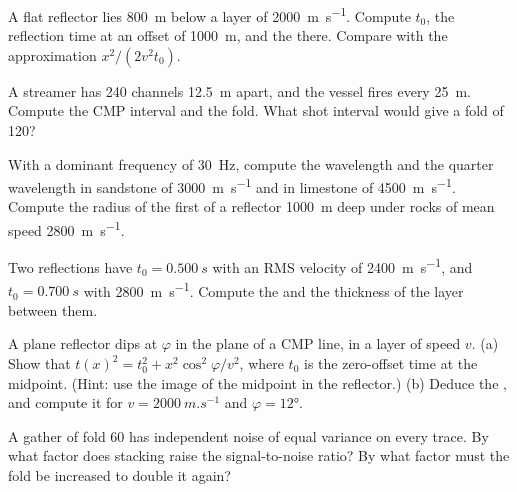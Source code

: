 \begin{exercise}[$\star$]\label{exo:b3:exploration-seismology:2}
A flat reflector lies \qty{800}{m} below a layer of \qty{2000}{m.s^{-1}}.
Compute $t_0$, the reflection time at an offset of \qty{1000}{m}, and the  there. Compare with the approximation $x^2/(2v^2t_0)$.
\end{exercise}

\begin{exercise}[$\star$]\label{exo:b3:exploration-seismology:3}
A streamer has 240 channels \qty{12.5}{m} apart, and the vessel fires every
\qty{25}{m}. Compute the CMP interval and the fold. What shot interval would
give a fold of 120?
\end{exercise}

\begin{exercise}[$\star$]\label{exo:b3:exploration-seismology:4}
With a dominant frequency of \qty{30}{Hz}, compute the wavelength and the
quarter wavelength in sandstone of \qty{3000}{m.s^{-1}} and in limestone of
\qty{4500}{m.s^{-1}}. Compute the radius of the first  of a
reflector \qty{1000}{m} deep under rocks of mean speed \qty{2800}{m.s^{-1}}.
\end{exercise}

\begin{exercise}[$\star\star$]\label{exo:b3:exploration-seismology:5}
Two reflections have $t_0 = \qty{0.500}{s}$ with an RMS velocity of
\qty{2400}{m.s^{-1}}, and $t_0 = \qty{0.700}{s}$ with \qty{2800}{m.s^{-1}}.
Compute the  and the thickness of the layer between them.
\end{exercise}

\begin{exercise}[$\star\star$]\label{exo:b3:exploration-seismology:6}
A plane reflector dips at $\varphi$ in the plane of a CMP line, in a layer of
speed $v$. (a) Show that $t(x)^2 = t_0^2 + x^2\cos^2\varphi/v^2$, where $t_0$ is
the zero-offset time at the midpoint. (Hint: use the image of the midpoint in
the reflector.) (b) Deduce the , and compute it for
$v = \qty{2000}{m.s^{-1}}$ and $\varphi = \ang{12}$.
\end{exercise}

\begin{exercise}[$\star\star$]\label{exo:b3:exploration-seismology:7}
A gather of fold 60 has independent noise of equal variance on every trace. By
what factor does stacking raise the signal-to-noise ratio? By what factor must
the fold be increased to double it again?
\end{exercise}

